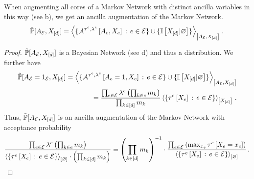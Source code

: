 \begin{lemma}\label{lem:markovNetworkAugmentation}
    When augmenting all cores of a Markov Network with distinct ancilla variables in this way (see b), we get an ancilla augmentation of the Markov Network.
    \begin{align*}
        \tilde{\mathbb{P}}[A_{\mathcal{E}},X_{[d]}]
        = \left\langle 
            \{\mathcal{A}^{\tau^{e},\lambda^{e}}\left[A_{e},X_{e}\right] \,:\, e\in\mathcal{E} \}
            \cup\{\mathbb{I}\left[X_{[d]}|\varnothing\right]\}\right\rangle_{\left[ A_{\mathcal{E}},X_{[d]} \right]} \, .
    \end{align*}
\end{lemma}
\begin{proof}
    $\tilde{\mathbb{P}}[A_{\mathcal{E}},X_{[d]}]$ is a Bayesian Network (see d) and thus a distribution.
    We further have
    \begin{align*}
        \tilde{\mathbb{P}}[A_{\mathcal{E}}=1_{\mathcal{E}},X_{[d]}]
        = \left\langle 
            \{\mathcal{A}^{\tau^{e},\lambda^{e}}\left[A_{e}=1,X_{e}\right] \,:\, e\in\mathcal{E} \}
            \cup\{\mathbb{I}\left[X_{[d]}|\varnothing\right]\}\right\rangle_{\left[ A_{\mathcal{E}},X_{[d]} \right]} \\
        = \frac{\prod_{e\in\mathcal{E}} \lambda^{e}\left(\prod_{k\in e}m_{k}\right)}{\prod_{k\in[d]}m_{k}}
        \left\langle \{\tau^{e}\left[X_{e}\right] \,:\,e\in\mathcal{E} \}\right\rangle_{\left[ X_{[d]} \right]} \, .
    \end{align*}
    Thus, $\tilde{\mathbb{P}}[A_{\mathcal{E}},X_{[d]}]$ is an ancilla augmentation of the Markov Network with acceptance probability
    \begin{align*}
        \frac{
            \prod_{e\in\mathcal{E}} \lambda^{e}\left(\prod_{k\in e}m_{k}\right)
        }{
            \left\langle \{\tau^{e}\left[X_{e}\right] \,:\,e\in\mathcal{E}\}\right\rangle_{\left[ \varnothing \right]} \cdot \left(\prod_{k\in[d]}m_{k}\right)
        }
        = \left(\prod_{k\in[d]}m_{k}\right)^{-1} \cdot
        \frac{\prod_{e\in\mathcal{E}} \left(\max_{x_{e}} \tau^{e}\left[X_{e}=x_{e}\right]\right)}{\left\langle \{\tau^{e}\left[X_{e}\right] \,:\,e\in\mathcal{E}\}\right\rangle_{\left[ \varnothing \right]}}
        \, .
    \end{align*}
\end{proof}




